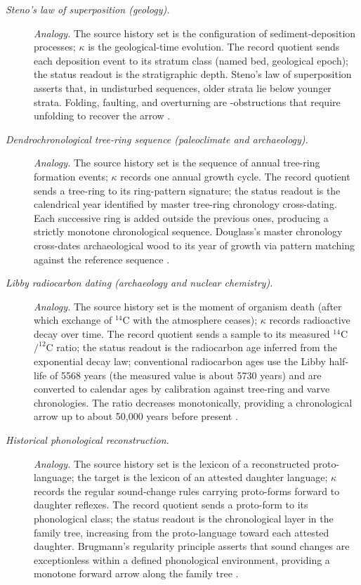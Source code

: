 \begin{description}
\item[\emph{Steno's law of superposition (geology).}] \textit{Analogy.}
The source history set is the configuration of
sediment-deposition processes; \(\kappa\) is the
geological-time evolution.  The record quotient sends
each deposition event to its stratum class (named bed,
geological epoch); the status readout is the
stratigraphic depth.  Steno's law of superposition
asserts that, in undisturbed sequences, older strata
lie below younger strata.  Folding, faulting, and
overturning are -obstructions that require
unfolding to recover the arrow \citep{Steno1669Prodromus}.

\item[\emph{Dendrochronological tree-ring sequence
(paleoclimate and archaeology).}] \textit{Analogy.}
The source history set is the sequence of annual
tree-ring formation events; \(\kappa\) records one
annual growth cycle.  The record quotient sends a
tree-ring to its ring-pattern signature; the status
readout is the calendrical year identified by master
tree-ring chronology cross-dating.  Each successive
ring is added outside the previous ones, producing a
strictly monotone chronological sequence.  Douglass's
master chronology cross-dates archaeological wood to
its year of growth via pattern matching against the
reference sequence \citep{Douglass1919ClimaticCycles}.

\item[\emph{Libby radiocarbon dating (archaeology and
nuclear chemistry).}] \textit{Analogy.}
The source history set is the moment of organism death
(after which exchange of \(^{14}\)C with the atmosphere
ceases); \(\kappa\) records radioactive decay over
time.  The record quotient sends a sample to its
measured \(^{14}\)C\(/^{12}\)C ratio; the status readout
is the radiocarbon age inferred from the exponential decay law;
conventional radiocarbon ages use the Libby half-life of 5568 years
(the measured value is about 5730 years) and are converted to
calendar ages by calibration against tree-ring and varve
chronologies.  The ratio decreases monotonically, providing a
chronological arrow up to about 50{,}000 years before present \citep{Libby1955RadiocarbonDating}.

\item[\emph{Historical phonological reconstruction.}] \textit{Analogy.}
The source history set is the lexicon of a
reconstructed proto-language; the target is the
lexicon of an attested daughter language; \(\kappa\)
records the regular sound-change rules carrying
proto-forms forward to daughter reflexes.  The record
quotient sends a proto-form to its phonological class;
the status readout is the chronological layer in the
family tree, increasing from the proto-language toward
each attested daughter.  Brugmann's regularity
principle asserts that sound changes are exceptionless
within a defined phonological environment, providing a
monotone forward arrow along the family tree
\citep{Brugmann1886Grundriss}.
\end{description}
\endgroup

